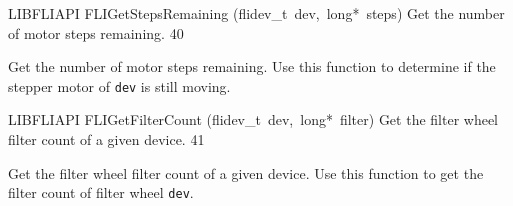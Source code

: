 \documentclass{article}
\begin{document}
\begin{cxxfunction}
{LIBFLIAPI}
        {FLIGetStepsRemaining}
        {(flidev\_t\ dev,\ long*\ steps)}
        {
 Get the number of motor steps remaining.}
        {40}
\begin{cxxdoc}

Get the number of motor steps remaining. Use this function
to determine if the stepper motor of \texttt{dev} is still moving.


\end{cxxdoc}
\end{cxxfunction}
\begin{cxxfunction}
{LIBFLIAPI}
        {FLIGetFilterCount}
        {(flidev\_t\ dev,\ long*\ filter)}
        {
 Get the filter wheel filter count of a given device.}
        {41}
\begin{cxxdoc}

Get the filter wheel filter count of a given device.  Use this
function to get the filter count of filter wheel \texttt{dev}.


\end{cxxdoc}
\end{cxxfunction}
\end{document}
